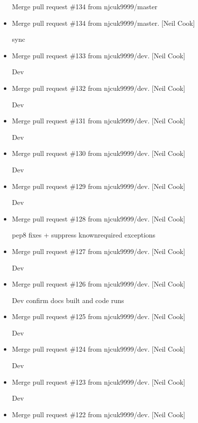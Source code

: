 \documentclass[a4paper,10pt,english]{report}
\begin{document}
\begin{itemize}
Merge pull request \#134 from njcuk9999/master

\item {} 
Merge pull request \#134 from njcuk9999/master. {[}Neil Cook{]}

sync

\item {} 
Merge pull request \#133 from njcuk9999/dev. {[}Neil Cook{]}

Dev

\item {} 
Merge pull request \#132 from njcuk9999/dev. {[}Neil Cook{]}

Dev

\item {} 
Merge pull request \#131 from njcuk9999/dev. {[}Neil Cook{]}

Dev

\item {} 
Merge pull request \#130 from njcuk9999/dev. {[}Neil Cook{]}

Dev

\item {} 
Merge pull request \#129 from njcuk9999/dev. {[}Neil Cook{]}

Dev

\item {} 
Merge pull request \#128 from njcuk9999/dev. {[}Neil Cook{]}

pep8 fixes + suppress known\sphinxhyphen{}required exceptions

\item {} 
Merge pull request \#127 from njcuk9999/dev. {[}Neil Cook{]}

Dev

\item {} 
Merge pull request \#126 from njcuk9999/dev. {[}Neil Cook{]}

Dev \sphinxhyphen{} confirm docs built and code runs

\item {} 
Merge pull request \#125 from njcuk9999/dev. {[}Neil Cook{]}

Dev

\item {} 
Merge pull request \#124 from njcuk9999/dev. {[}Neil Cook{]}

Dev

\item {} 
Merge pull request \#123 from njcuk9999/dev. {[}Neil Cook{]}

Dev

\item {} 
Merge pull request \#122 from njcuk9999/dev. {[}Neil Cook{]}


\end{itemize}
\end{document}
